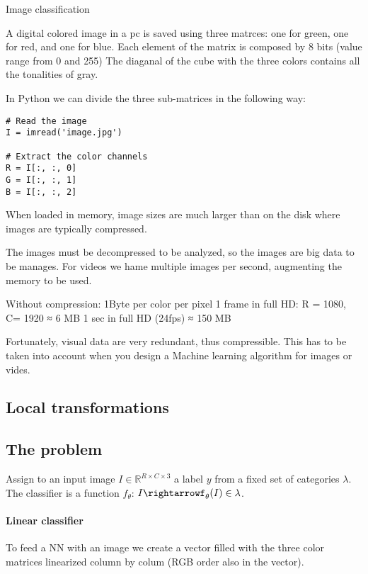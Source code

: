 \caption{Image classification}

A digital colored image in a pc is saved using three matrces: one for green, one for red, and one for blue. 
Each element of the matrix is composed by 8 bits (value range from 0 and 255)
The diaganal of the cube with the three colors contains all the tonalities of gray. 

In Python we can divide the three sub-matrices in the following way: 
\begin{verbatim}
# Read the image
I = imread('image.jpg')

# Extract the color channels
R = I[:, :, 0]
G = I[:, :, 1]
B = I[:, :, 2]
\end{verbatim}
When loaded in memory, image sizes are much larger than on the disk where images are typically compressed. 

The images must be decompressed to be analyzed, so the images are big data to be manages. 
For videos we hame multiple images per second, augmenting the memory to be used. 

Without compression: 1Byte per color per pixel
1 frame in full HD: R = 1080, C= 1920 ≈ 6 MB
1 sec in full HD (24fps) ≈ 150 MB

Fortunately, visual data are very redundant, thus compressible.
This has to be taken into account when you design a Machine learning algorithm for images or vides.


\subsection{Local transformations}






\subsection{The problem}

Assign to an input image $I\in\mathbb{R}^{R\times C \times 3}$ a label $y$ from a fixed set of categories $\lambda$. 
The classifier is a function $f_\theta$: $I \rightarrowf_\theta(I)\in\lambda$. 

\paragraph*{Linear classifier}
To feed a NN with an image we create a vector filled with the three color matrices linearized column by colum (RGB order also in the vector).




